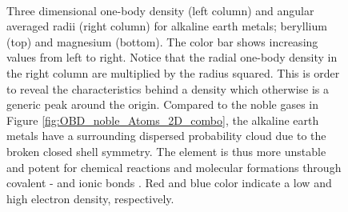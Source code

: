 \begin{figure}
\begin{center}
     \\
  \caption{Three dimensional one-body density (left column) and angular averaged radii (right column) for alkaline earth metals; beryllium (top) and magnesium (bottom). The color bar shows increasing values from left to right. Notice that the radial one-body density in the right column are multiplied by the radius squared. This is order to reveal the characteristics behind a density which otherwise is a generic peak around the origin. Compared to the noble gases in Figure \ref{fig:OBD_noble_Atoms_2D_combo}, the alkaline earth metals have a surrounding dispersed probability cloud due to the broken closed shell symmetry. The element is thus more unstable and potent for chemical reactions and molecular formations through covalent - and ionic bonds \cite{UniversityPhysics}. Red and blue color indicate a low and high electron density, respectively.}
  \label{fig:OBD_alkaline_Atoms_2D_combo}
 \end{center}
\end{figure}
 
